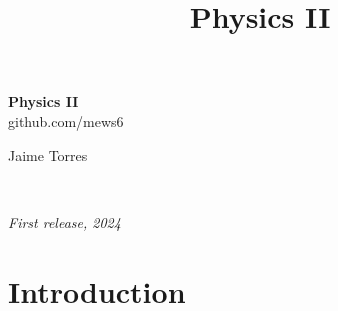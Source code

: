 \documentclass[11pt,fleqn]{book} %
\begin{document}
\title{Physics II}


\begingroup
\thispagestyle{empty}
\centering
\vspace*{5cm}
\par\normalfont\fontsize{35}{35}\sffamily\selectfont
\textbf{Physics II}\\
{\LARGE github.com/mews6}\par %
\vspace*{1cm}
{Jaime Torres}\par %
\endgroup


\newpage
~\vfill
\thispagestyle{empty}


\noindent \textit{First release, 2024} %



\pagestyle{empty} %

\tableofcontents %


\pagestyle{fancy} %



\chapter{Introduction}
\end{document}
